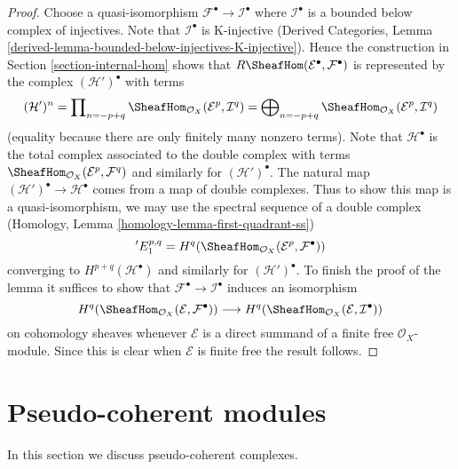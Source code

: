 \begin{proof}
Choose a quasi-isomorphism $\mathcal{F}^\bullet \to \mathcal{I}^\bullet$
where $\mathcal{I}^\bullet$ is a bounded below complex of injectives.
Note that $\mathcal{I}^\bullet$ is K-injective
(Derived Categories, Lemma
\ref{derived-lemma-bounded-below-injectives-K-injective}).
Hence the construction in Section \ref{section-internal-hom}
shows that
$R\SheafHom(\mathcal{E}^\bullet, \mathcal{F}^\bullet)$ is 
represented by the complex $(\mathcal{H}')^\bullet$ with terms
$$
(\mathcal{H}')^n =
\prod\nolimits_{n = - p + q}
\SheafHom_{\mathcal{O}_X}(\mathcal{E}^p, \mathcal{I}^q) =
\bigoplus\nolimits_{n = - p + q}
\SheafHom_{\mathcal{O}_X}(\mathcal{E}^p, \mathcal{I}^q)
$$
(equality because there are only finitely many nonzero terms).
Note that $\mathcal{H}^\bullet$ is the total complex associated to
the double complex with terms
$\SheafHom_{\mathcal{O}_X}(\mathcal{E}^p, \mathcal{F}^q)$
and similarly for $(\mathcal{H}')^\bullet$.
The natural map $(\mathcal{H}')^\bullet \to \mathcal{H}^\bullet$
comes from a map of double complexes.
Thus to show this map is a quasi-isomorphism, we may use the spectral
sequence of a double complex
(Homology, Lemma \ref{homology-lemma-first-quadrant-ss})
$$
{}'E_1^{p, q} =
H^q(\SheafHom_{\mathcal{O}_X}(\mathcal{E}^p, \mathcal{F}^\bullet))
$$
converging to $H^{p + q}(\mathcal{H}^\bullet)$ and similarly for
$(\mathcal{H}')^\bullet$. To finish the proof of the lemma it
suffices to show that $\mathcal{F}^\bullet \to \mathcal{I}^\bullet$
induces an isomorphism
$$
H^q(\SheafHom_{\mathcal{O}_X}(\mathcal{E}, \mathcal{F}^\bullet))
\longrightarrow
H^q(\SheafHom_{\mathcal{O}_X}(\mathcal{E}, \mathcal{I}^\bullet))
$$
on cohomology sheaves whenever $\mathcal{E}$ is a direct summand of a
finite free $\mathcal{O}_X$-module. Since this is clear when $\mathcal{E}$
is finite free the result follows.
\end{proof}





\section{Pseudo-coherent modules}
\label{section-pseudo-coherent}

\noindent
In this section we discuss pseudo-coherent complexes.

